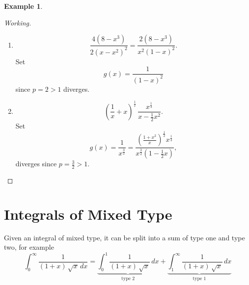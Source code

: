 \documentclass[12pt,a4paper]{report}
\theoremstyle{definition}
\newtheorem{exa}[thm]{Example}
\theoremstyle{plain}
\begin{document}
\begin{exa}
\begin{enumerate}
\begin{proof}[Working]
\begin{enumerate}
\item[(iii).] $$\frac{4(8-x^3)}{2(x - x^2)^2} = \frac{2(8 - x^3)}{x^2(1 - x)^2}.$$ Set $$g(x) = \frac{1}{(1-x)^2}$$ since $p = 2 > 1$ diverges.

\item[(iv).] $$\left(\frac{1}{x} + x\right)^{\frac{1}{2}} \, \frac{x^{\frac{1}{3}}}{x - \frac{1}{2}x^2}.$$ Set $$g(x) = \frac{1}{x^{\frac{3}{2}}} = \frac{\left(\frac{1 + x^2}{x}\right)^{\frac{1}{2}} x^{\frac{1}{3}}}{x^{\frac{3}{2}} \left(1 - \frac{1}{2}x\right)},$$ diverges since $p = \frac{3}{2} > 1$.
\end{enumerate}
\end{proof}
\end{enumerate}
\end{exa}









\section{Integrals of Mixed Type}
\vspace*{-5mm}
Given an integral of mixed type, it can be split into a sum of type one and type two, for example
$$\int_0^{\infty}\frac{1}{(1 + x)\, \sqrt{x}\, dx}  = \underbrace{\int_0^1\frac{1}{(1 + x)\, \sqrt{x}}\, dx}_{\text{type 2}} + \underbrace{\int_1^{\infty}\frac{1}{(1 + x) \, \sqrt{x}}\, dx}_{\text{type 1}}$$
\end{document}
